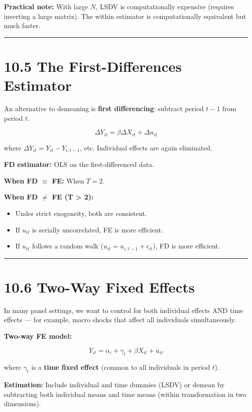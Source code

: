 \textbf{Practical note:} With large $N$, LSDV is computationally expensive (requires inverting a large matrix). The within estimator is computationally equivalent but much faster.

\medskip\hrule\medskip

\section{10.5 The First-Differences Estimator}

An alternative to demeaning is \textbf{first differencing}: subtract period $t-1$ from period $t$.

\[
\Delta Y_{it} = \beta \Delta X_{it} + \Delta u_{it}
\]

where $\Delta Y_{it} = Y_{it} - Y_{i,t-1}$, etc. Individual effects are again eliminated.

\textbf{FD estimator:} OLS on the first-differenced data.

\textbf{When FD $\equiv$ FE:} When $T = 2$.

\textbf{When FD $\neq$ FE (T > 2):}
\begin{itemize}
\item Under strict exogeneity, both are consistent.
\item If $u_{it}$ is serially uncorrelated, FE is more efficient.
\item If $u_{it}$ follows a random walk ($u_{it} = u_{i,t-1} + \epsilon_{it}$), FD is more efficient.
\end{itemize}

\medskip\hrule\medskip

\section{10.6 Two-Way Fixed Effects}

In many panel settings, we want to control for both individual effects AND time effects --- for example, macro shocks that affect all individuals simultaneously.

\textbf{Two-way FE model:}

\[
Y_{it} = \alpha_i + \gamma_t + \beta X_{it} + u_{it}
\]

where $\gamma_t$ is a \textbf{time fixed effect} (common to all individuals in period $t$).

\textbf{Estimation:} Include individual and time dummies (LSDV) or demean by subtracting both individual means and time means (within transformation in two dimensions).

